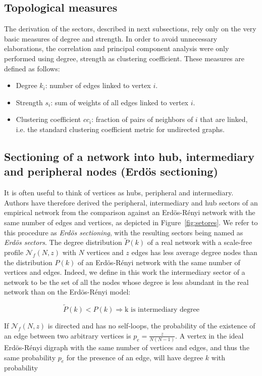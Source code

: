 \documentclass[review]{elsarticle}
\begin{document}
\subsection{Topological measures}\label{smes}
The derivation of the sectors, described in next subsections,
rely only on the very basic measures of degree and strength.
In order to avoid unnecessary elaborations, the correlation and principal component analysis
were only performed using degree, strength as clustering coefficient.
These measures are defined as follows:
\begin{itemize}
\item Degree $k_i$: number of edges linked to vertex $i$.
\item Strength $s_i$: sum of weights of all edges linked to vertex $i$.
\item Clustering coefficient $cc_i$:
  fraction of pairs of neighbors of $i$ that are linked, i.e. the standard clustering coefficient metric for undirected graphs.
\end{itemize}

\subsection{Sectioning of a network into hub, intermediary and peripheral nodes (Erdös sectioning)}\label{ssec}\label{sectioning}
It is often useful to think of vertices as hubs, peripheral and intermediary.
Authors have therefore derived the peripheral, intermediary and hub sectors of an empirical network
from the comparison against an Erd\"os-R\'enyi network with the same number of edges and vertices,
as depicted in Figure~\ref{fig:setores}. We refer to this procedure as \emph{Erd\"os sectioning},
with the resulting sectors being named as \emph{Erd\"os sectors}.
The degree distribution $\widetilde{P}(k)$ of a real network with a scale-free profile
$\mathcal{N}_f(N,z)$ with $N$ vertices and $z$ edges has less
average degree nodes than the distribution $P(k)$ of an Erd\"os-R\'enyi
network with the same number of vertices and edges.
Indeed, we define in this work the intermediary sector of a network to be the
set of all the nodes whose degree is less abundant in the real network than on the Erd\"os-R\'enyi model:

\begin{equation}\label{criterio}
\widetilde{P}(k)<P(k) \Rightarrow \text{k is intermediary degree}
\end{equation}

If $\mathcal{N}_f(N,z)$ is directed and has no self-loops, the probability of the existence
of an edge between two arbitrary vertices is $p_e=\frac{z}{N(N-1)}$.
A vertex in the ideal Erd\"os-R\'enyi digraph with the same number of vertices and edges,
and thus the same probability $p_e$ for the presence of an edge, will have degree $k$ with probability
\end{document}
